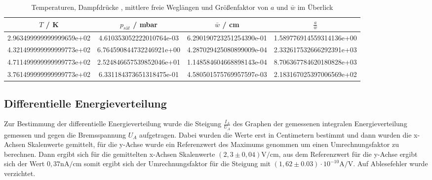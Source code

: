 \begin{table}
  \centering
  \caption{Temperaturen, Dampfdrücke , mittlere freie Weglängen und Größenfaktor von
  \texorpdfstring{$a$}{math} und \texorpdfstring{$\bar{w}$}{math} im Überlick }
  \begin{tabular}{S[scientific-notation = fixed , fixed-exponent = 0] S S S[scientific-notation = fixed , fixed-exponent = 0]}
    \toprule
    $T$ / \si{\kelvin} & $p_{sät}$ / \si{\milli \bar} & $\bar{w}$ / \si{\centi \meter} & $\frac{a}{\bar{w}} $ \\
    \midrule
    2.963499999999999659e+02 & 4.610353052222010764e-03 & 6.290190723251254390e-01 & 1.589776914559314136e+00\\
    4.321499999999999773e+02 & 6.764590844732246921e+00 & 4.287029425080899009e-04 & 2.332617532666292391e+03\\
    4.711499999999999773e+02 & 2.524846657539852046e+01 & 1.148584604668898143e-04 & 8.706367784620180828e+03\\
    3.761499999999999773e+02 & 6.331184373651318475e-01 & 4.580501575769957597e-03 & 2.183167025397006569e+02\\
    \bottomrule
  \end{tabular}
  \label{tab:ue}
\end{table}
\subsection{Differentielle Energieverteilung}
Zur Bestimmung der differentielle Energieverteilung wurde die Steigung $\frac{I_A}{U_A} $
des Graphen
der gemessenen integralen Energieverteilung gemessen und gegen die Bremsspannung $U_A$
aufgetragen. Dabei wurden die Werte erst in Centimetern bestimmt und dann wurden
die x-Achsen Skalenwerte gemittelt, für die y-Achse wurde ein Referenzwert des Maximums
genommen um einen Umrechnungsfaktor zu berechnen. Dann ergibt sich für die gemittelten
x-Achsen Skalenwerte $  (2,3 \pm 0,04)\si{\volt \per \centi \meter} $,
aus dem Referenzwert für die y-Achse ergibt sich der Wert $ 0,37 \si{\nano \ampere\per\centi \meter}$
somit ergibt sich der Umrechnungsfaktor für die Steigung mit $(1,62 \pm 0.03)\cdot 10^{-10}
\si{\ampere \per \volt} $. Auf Ablesefehler wurde verzichtet.

